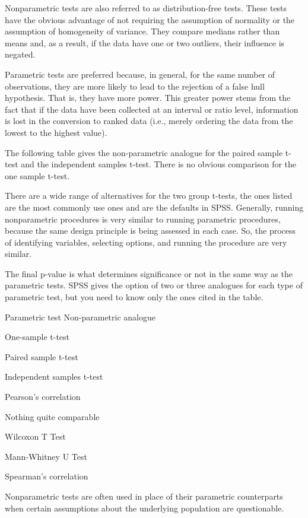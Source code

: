 Nonparametric tests are also referred to as distribution-free tests. These tests have the obvious advantage of not requiring the assumption of normality or the assumption of homogeneity of variance. They compare medians rather than means and, as a result, if the data have one or two outliers, their influence is negated.

Parametric tests are preferred because, in general, for the same number of observations, they are more likely to lead to the rejection of a false hull hypothesis. That is, they have more power. This greater power stems from the fact that if the data have been collected at an interval or ratio level, information is lost in the conversion to ranked data (i.e., merely ordering the data from the lowest to the highest value).

The following table gives the non-parametric analogue for the paired sample t-test and the independent samples t-test. There is no obvious comparison for the one sample t-test. 

There are a wide range of alternatives for the two group t-tests, the ones listed are the most commonly use ones and are the defaults in SPSS. Generally, running nonparametric procedures is very similar to running parametric procedures, because the same design principle is being assessed in each case. So, the process of identifying variables, selecting options, and running the procedure are very similar. 

The final p-value is what determines significance or not in the same way as the parametric tests. SPSS gives the option of two or three analogues for each type of parametric test, but you need to know only the ones cited in the table. 

Parametric test
	Non-parametric analogue

One-sample t-test 

Paired sample t-test 

Independent samples t-test 

Pearson's correlation 

	Nothing quite comparable 

Wilcoxon T Test 

Mann-Whitney U Test 

Spearman's correlation 
 
 

Nonparametric tests are often used in place of their parametric counterparts when certain assumptions about the underlying population are questionable. 

